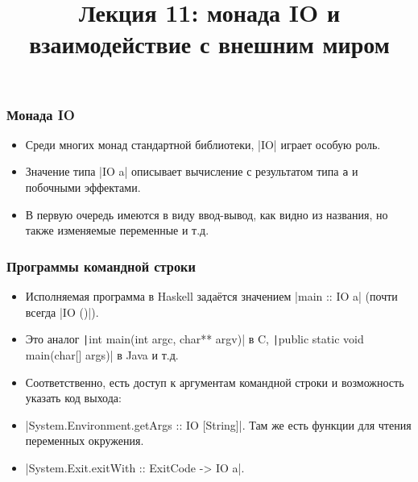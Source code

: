 \documentclass[11pt]{beamer}
\title{Лекция 11: монада IO и взаимодействие с внешним миром}
\begin{document}
\begin{frame}[plain]
    \maketitle
\end{frame}

\begin{frame}[fragile]
\frametitle{Монада IO}
\begin{itemize}
    \item Среди многих монад стандартной библиотеки, \haskinline|IO| играет особую роль.
    \item Значение типа \haskinline|IO a| описывает вычисление с результатом типа \lstinline|a| и побочными эффектами.
    \item В первую очередь имеются в виду ввод-вывод, как видно из названия, но также изменяемые переменные и т.д.
\end{itemize}
\end{frame}

\begin{frame}[fragile]
\frametitle{Программы командной строки}
\begin{itemize}
    \item Исполняемая программа в Haskell задаётся значением
    \haskinline|main :: IO a| (почти всегда \haskinline|IO ()|).
    \item Это аналог \texttt|int main(int argc, char** argv)| в C, \texttt|public static void main(char[] args)| в Java и т.д.
    \item Соответственно, есть доступ к аргументам командной строки и возможность указать код выхода:
    \item \haskinline|System.Environment.getArgs :: IO [String]|. Там же есть функции для чтения переменных окружения.
    \item \haskinline|System.Exit.exitWith :: ExitCode -> IO a|.
\end{itemize}
\end{frame}
\end{document}
